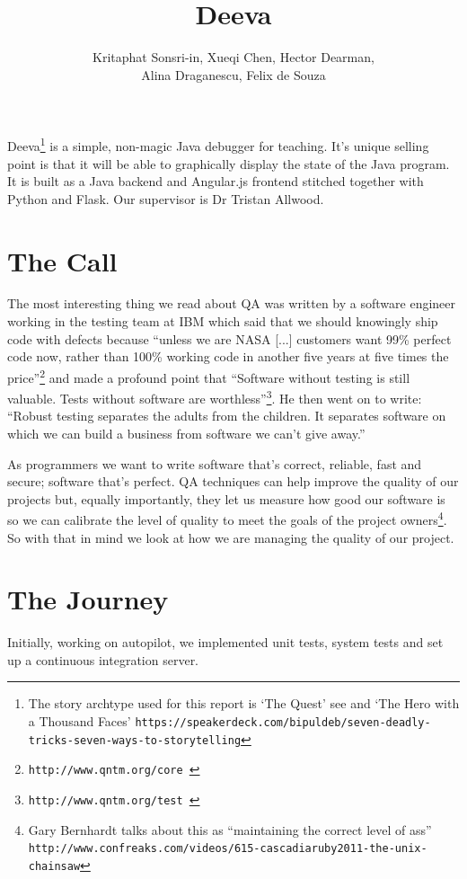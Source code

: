 \documentclass[11pt, a4paper]{article}
\newcommand{\subtitle}[1]{
  \posttitle{
    \par\end{center}
    \begin{center}\large#1\end{center}
    \vskip0.5em}
}
\begin{document}
\title{Deeva}
\subtitle{Quality Assurance Report}
\author{Kritaphat Sonsri-in, Xueqi Chen, Hector Dearman, \\Alina Draganescu, Felix de Souza}

\maketitle

Deeva\footnote{The story archtype used for this report is `The Quest' see and `The Hero with a Thousand Faces' \tt{https://speakerdeck.com/bipuldeb/seven-deadly-tricks-seven-ways-to-storytelling}} is a simple, non-magic Java debugger for teaching. It's unique selling point is that it will be able to graphically display the state of the Java program. It is built as a Java backend and Angular.js frontend stitched together with Python and Flask. Our supervisor is Dr Tristan Allwood.

\section{The Call}
The most interesting thing we read about QA was written by a software engineer working in the testing team at IBM which said that we should knowingly ship code with defects because ``unless we are NASA [...] customers want 99\% perfect code now, rather than 100\% working code in another five years at five times the price''\footnote{\tt{http://www.qntm.org/core }} and made a profound point that ``Software without testing is still valuable. Tests without software are worthless''\footnote{\tt{http://www.qntm.org/test }}. He then went on to write: ``Robust testing separates the adults from the children. It separates software on which we can build a business from software we can't give away.'' 

As programmers we want to write software that's correct, reliable, fast and secure; software that's perfect. QA techniques can help improve the quality of our projects but, equally importantly, they let us measure how good our software is so we can calibrate the level of quality to meet the goals of the project owners\footnote{Gary Bernhardt talks about this as ``maintaining the correct level of ass'' \tt{http://www.confreaks.com/videos/615-cascadiaruby2011-the-unix-chainsaw}}. So with that in mind we look at how we are managing the quality of our project. 

\section{The Journey}
Initially, working on autopilot, we implemented unit tests, system tests and set up a continuous integration server. 
\end{document}
